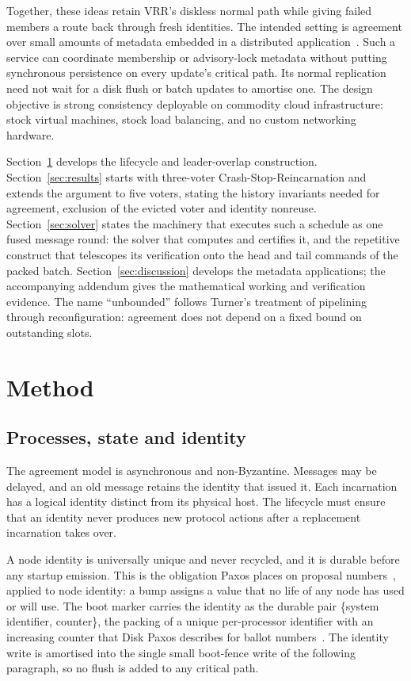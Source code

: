 \documentclass[10pt,journal,letterpaper]{IEEEtran}
\begin{document}
Together, these ideas retain VRR's diskless normal path while giving failed
members a route back through fresh identities.
The intended setting is agreement over small amounts of metadata embedded in a
distributed application~\cite{motivation}.
Such a service can coordinate membership or advisory-lock metadata without
putting synchronous persistence on every update's critical path.
Its normal replication need not wait for a disk flush or batch updates to
amortise one.
The design objective is strong consistency deployable on commodity cloud
infrastructure: stock virtual machines, stock load balancing, and no custom
networking hardware.

Section~\ref{sec:method} develops the lifecycle and leader-overlap construction.
Section~\ref{sec:results} starts with three-voter Crash-Stop-Reincarnation
and extends the argument to five voters, stating the history invariants needed
for agreement, exclusion of the evicted voter and identity nonreuse.
Section~\ref{sec:solver} states the machinery that executes such a schedule as
one fused message round: the solver that computes and certifies it, and the
repetitive construct that telescopes its verification onto the head and tail
commands of the packed batch.
Section~\ref{sec:discussion} develops the metadata applications; the accompanying
addendum gives the mathematical working and verification evidence.
The name ``unbounded'' follows Turner's treatment of pipelining through
reconfiguration: agreement does not depend on a fixed bound on outstanding slots.

\section{Method}\label{sec:method}
\subsection{Processes, state and identity}
The agreement model is asynchronous and non-Byzantine. Messages may be delayed, and an old message retains the identity that issued it. Each incarnation has a logical identity distinct from its physical host. The lifecycle must ensure that an identity never produces new protocol actions after a replacement incarnation takes over.

A node identity is universally unique and never recycled, and it is durable before any startup emission. This is the obligation Paxos places on proposal numbers~\cite{pms}, applied to node identity: a bump assigns a value that no life of any node has used or will use. The boot marker carries the identity as the durable pair \{system identifier, counter\}, the packing of a unique per-processor identifier with an increasing counter that Disk Paxos describes for ballot numbers~\cite{diskpaxos}. The identity write is amortised into the single small boot-fence write of the following paragraph, so no flush is added to any critical path.
\end{document}
